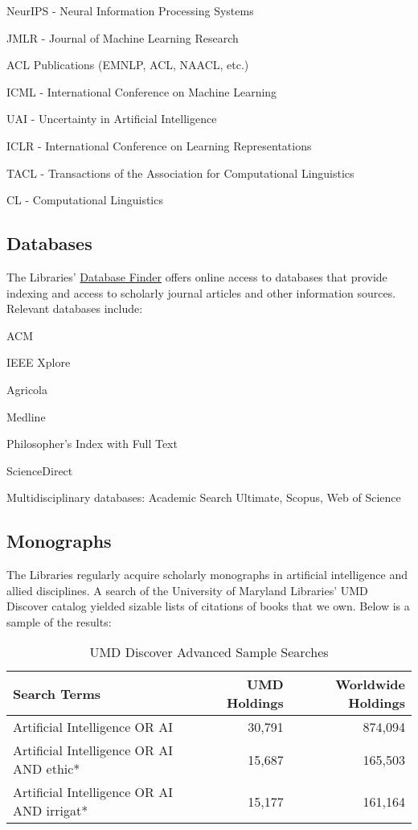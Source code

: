 \begin{itemize*}
    \item NeurIPS - Neural Information Processing Systems
    \item JMLR - Journal of Machine Learning Research
    \item ACL Publications (EMNLP, ACL, NAACL, etc.)
    \item ICML - International Conference on Machine Learning
    \item UAI - Uncertainty in Artificial Intelligence
    \item ICLR - International Conference on Learning Representations
    \item TACL - Transactions of the Association for Computational Linguistics
    \item CL - Computational Linguistics
\end{itemize*}

\subsection*{Databases}
The Libraries’ \href{https://lib.guides.umd.edu/az.php}{Database Finder} offers online access to databases that provide indexing and access to scholarly journal articles and other information sources. Relevant databases include:
\begin{itemize*}
    \item ACM
    \item IEEE Xplore
    \item Agricola
    \item Medline
    \item Philosopher's Index with Full Text
    \item ScienceDirect
    \item Multidisciplinary databases: Academic Search Ultimate, Scopus, Web of Science
\end{itemize*}

\subsection*{Monographs}
The Libraries regularly acquire scholarly monographs in artificial intelligence and allied disciplines. A search of the University of Maryland Libraries’ UMD Discover catalog yielded sizable lists of citations of books that we own. Below is a sample of the results:

\begin{table}[h!]
\centering
\begin{tabular}{|l|r|r|}
\hline
\textbf{Search Terms} & \textbf{UMD Holdings} & \textbf{Worldwide Holdings} \\
\hline
Artificial Intelligence OR AI & 30,791 & 874,094 \\
Artificial Intelligence OR AI AND ethic* & 15,687 & 165,503 \\
Artificial Intelligence OR AI AND irrigat* & 15,177 & 161,164 \\
\hline
\end{tabular}
\caption{UMD Discover Advanced Sample Searches}
\end{table}

